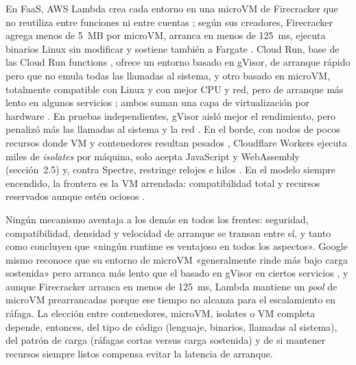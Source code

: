 \documentclass[12pt, letterpaper, table, xcdraw]{inf-pucv}
\begin{document}
En FaaS, AWS Lambda crea cada entorno en una microVM de Firecracker que no reutiliza entre funciones ni entre cuentas \parencite{awslambdasec}; según sus creadores, Firecracker agrega menos de 5~MB por microVM, arranca en menos de 125~ms, ejecuta binarios Linux sin modificar y sostiene también a Fargate \parencite{agache2020}. Cloud Run, base de las Cloud Run functions \parencite{gcprunfunctions}, ofrece un entorno basado en gVisor, de arranque rápido pero que no emula todas las llamadas al sistema, y otro basado en microVM, totalmente compatible con Linux y con mejor CPU y red, pero de arranque más lento en algunos servicios \parencite{gcprunenv}; ambos suman una capa de virtualización por hardware \parencite{gcprunsec}. En pruebas independientes, gVisor aisló mejor el rendimiento, pero penalizó más las llamadas al sistema y la red \parencite{wang2022}. En el borde, con nodos de pocos recursos donde VM y contenedores resultan pesados \parencite{xie2021}, Cloudflare Workers ejecuta miles de \textit{isolates} por máquina, solo acepta JavaScript y WebAssembly (sección~2.5) y, contra Spectre, restringe relojes e hilos \parencite{cfworkerssec}. En el modelo siempre encendido, la frontera es la VM arrendada: compatibilidad total \parencite{agache2020} y recursos reservados aunque estén ociosos \parencite{liu2024demystifying}.

Ningún mecanismo aventaja a los demás en todos los frentes: seguridad, compatibilidad, densidad y velocidad de arranque se transan entre sí, y tanto \textcite{agache2020} como \textcite{wang2022} concluyen que «ningún runtime es ventajoso en todos los aspectos». Google mismo reconoce que su entorno de microVM «generalmente rinde más bajo carga sostenida» pero arranca más lento que el basado en gVisor en ciertos servicios \parencite{gcprunenv}, y aunque Firecracker arranca en menos de 125~ms, Lambda mantiene un \textit{pool} de microVM prearrancadas porque ese tiempo no alcanza para el escalamiento en ráfaga. La elección entre contenedores, microVM, isolates o VM completa depende, entonces, del tipo de código (lenguaje, binarios, llamadas al sistema), del patrón de carga (ráfagas cortas versus carga sostenida) y de si mantener recursos siempre listos compensa evitar la latencia de arranque.
\end{document}
